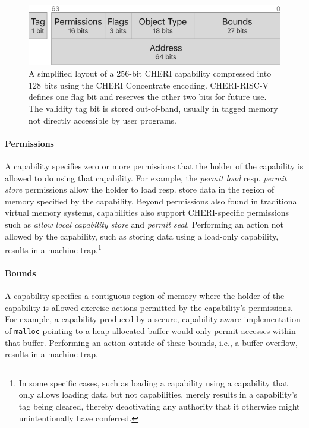 \documentclass[main.tex]{subfiles}
\begin{document}

\begin{figure}
	\centering
	\includegraphics{Images/CHERI Concentrate Layout.pdf}
	\caption{A simplified layout of a 256-bit CHERI capability compressed into 128 bits using the CHERI Concentrate encoding. CHERI-RISC-V defines one flag bit and reserves the other two bits for future use. The validity tag bit is stored out-of-band, usually in tagged memory not directly accessible by user programs.}
	\label{fig:chericoncentrate}
\end{figure}

\paragraph{Permissions} A capability specifies zero or more permissions that the holder of the capability is allowed to do using that capability.  For example, the \emph{permit load} resp. \emph{permit store} permissions allow the holder to load resp. store data in the region of memory specified by the capability. Beyond permissions also found in traditional virtual memory systems, capabilities also support CHERI-specific permissions such as \emph{allow local capability store} and \emph{permit seal}.  Performing an action not allowed by the capability, such as storing data using a load-only capability, results in a machine trap.\footnote{In some specific cases, such as loading a capability using a capability that only allows loading data but not capabilities, merely results in a capability's tag being cleared, thereby deactivating any authority that it otherwise might unintentionally have conferred.}

\paragraph{Bounds} A capability specifies a contiguous region of memory where the holder of the capability is allowed exercise actions permitted by the capability's permissions. For example, a capability produced by a secure, capability-aware implementation of \texttt{malloc} pointing to a heap-allocated buffer would only permit accesses within that buffer. Performing an action outside of these bounds, i.e., a buffer overflow, results in a machine trap.
\end{document}

